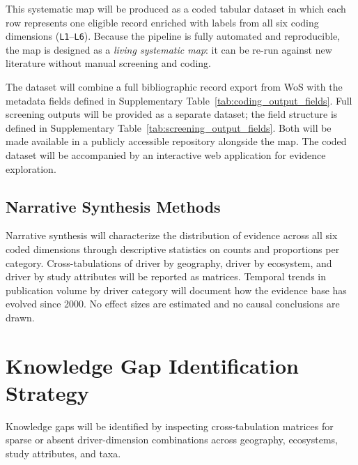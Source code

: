\documentclass[12pt]{article}
\begin{document}
This systematic map will be produced as a coded tabular dataset in which 
each row represents one eligible record enriched with labels from all six coding dimensions (\texttt{L1}--\texttt{L6}). Because the pipeline is fully automated and reproducible, the map is designed as a \emph{living systematic map}: it can be re-run against new literature without manual screening and coding.

The dataset will combine a full bibliographic record export from WoS with the metadata fields defined in Supplementary Table~\ref{tab:coding_output_fields}. Full screening outputs will be provided as a separate dataset; the field structure is defined in Supplementary Table~\ref{tab:screening_output_fields}. Both will be made available in a publicly accessible repository alongside the map. The coded dataset will be accompanied by an interactive web application for evidence exploration.

\subsection*{Narrative Synthesis Methods}
Narrative synthesis will characterize the distribution of evidence across all six coded dimensions through descriptive statistics on counts and proportions per category. Cross-tabulations of driver by geography, driver by ecosystem, and driver by study attributes will be reported as matrices. Temporal trends in publication volume by driver category will document how the evidence base has evolved since 2000. No effect sizes are estimated and no causal conclusions are drawn.

\section*{Knowledge Gap Identification Strategy}
Knowledge gaps will be identified by inspecting cross-tabulation matrices for sparse or absent driver-dimension combinations across geography, ecosystems, study attributes, and taxa. 
\end{document}
